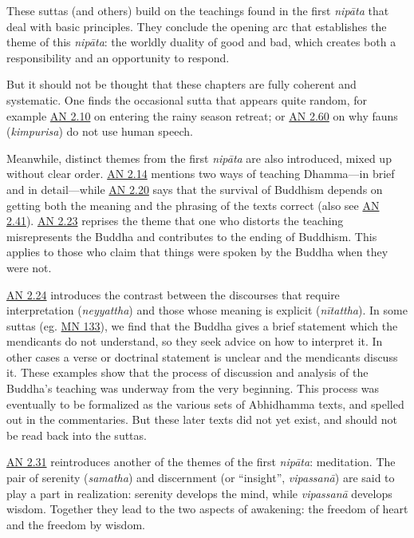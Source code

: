 \documentclass[12pt,openany]{book}%
\begin{document}
These suttas (and others) build on the teachings found in the first \textit{\textsanskrit{nipāta}} that deal with basic principles. They conclude the opening arc that establishes the theme of this \textit{\textsanskrit{nipāta}}: the worldly duality of good and bad, which creates both a responsibility and an opportunity to respond.

But it should not be thought that these chapters are fully coherent and systematic. One finds the occasional sutta that appears quite random, for example \href{https://suttacentral.net/an2.1{-}10}{AN 2.10} on entering the rainy season retreat; or \href{https://suttacentral.net/an2.52{-}63}{AN 2.60} on why fauns (\textit{kimpurisa}) do not use human speech.

Meanwhile, distinct themes from the first \textit{\textsanskrit{nipāta}} are also introduced, mixed up without clear order. \href{https://suttacentral.net/an2.11{-}20}{AN 2.14} mentions two ways of teaching Dhamma—in brief and in detail—while \href{https://suttacentral.net/an2.11{-}20}{AN 2.20} says that the survival of Buddhism depends on getting both the meaning and the phrasing of the texts correct (also see \href{https://suttacentral.net/an2.32{-}41}{AN 2.41}). \href{https://suttacentral.net/an2.21{-}31}{AN 2.23} reprises the theme that one who distorts the teaching misrepresents the Buddha and contributes to the ending of Buddhism. This applies to those who claim that things were spoken by the Buddha when they were not.

\href{https://suttacentral.net/an2.21{-}31}{AN 2.24} introduces the contrast between the discourses that require interpretation (\textit{neyyattha}) and those whose meaning is explicit (\textit{\textsanskrit{nītattha}}). In some suttas (eg. \href{https://suttacentral.net/mn133}{MN 133}), we find that the Buddha gives a brief statement which the mendicants do not understand, so they seek advice on how to interpret it. In other cases a verse or doctrinal statement is unclear and the mendicants discuss it. These examples show that the process of discussion and analysis of the Buddha’s teaching was underway from the very beginning. This process was eventually to be formalized as the various sets of Abhidhamma texts, and spelled out in the commentaries. But these later texts did not yet exist, and should not be read back into the suttas.

\href{https://suttacentral.net/an2.21{-}31}{AN 2.31} reintroduces another of the themes of the first \textit{\textsanskrit{nipāta}}: meditation. The pair of serenity (\textit{samatha}) and discernment (or “insight”, \textit{\textsanskrit{vipassanā}}) are said to play a part in realization: serenity develops the mind, while \textit{\textsanskrit{vipassanā}} develops wisdom. Together they lead to the two aspects of awakening: the freedom of heart and the freedom by wisdom.
\end{document}
